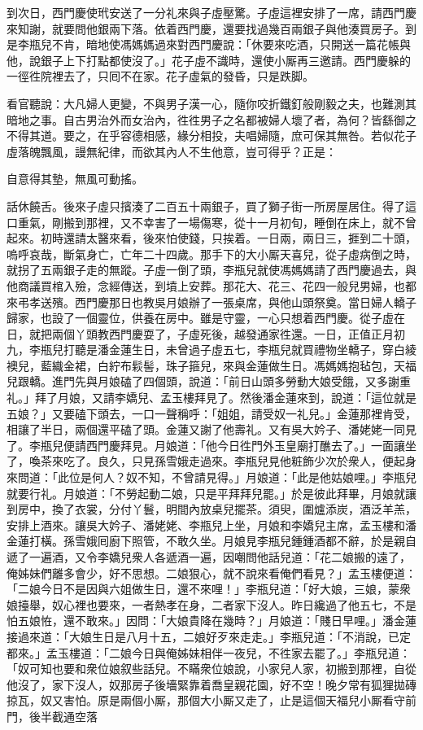 到次日，西門慶使玳安送了一分礼來與子虛壓驚。子虛這裡安排了一席，請西門慶來知謝，就要問他銀兩下落。依着西門慶，還要找過幾百兩銀子與他湊買房子。到是李瓶兒不肯，{}暗地使馮媽媽過來對西門慶說：「休要來吃酒，只開送一篇花帳與他，說銀子上下打點都使沒了。」花子虛不識時，還使小厮再三邀請。西門慶躲的一徑徃院裡去了，只囘不在家。花子虛氣的發昏，只是跌脚。

看官聽說：大凡婦人更變，不與男子漢一心，隨你咬折鐵釘般剛毅之夫，也難測其暗地之事。自古男治外而女治內，徃徃男子之名都被婦人壞了者，為何？皆繇御之不得其道。要之，在乎容德相感，緣分相投，夫唱婦隨，庶可保其無咎。若似花子虛落魄飄風，謾無紀律，而欲其內人不生他意，豈可得乎？正是：

自意得其墊，無風可動搖。

話休饒舌。後來子虛只擯湊了二百五十兩銀子，買了獅子街一所房屋居住。得了這口重氣，剛搬到那裡，又不幸害了一場傷寒，從十一月初旬，睡倒在床上，就不曾起來。初時還請太醫來看，後來怕使錢，只挨着。一日兩，兩日三，捱到二十頭，嗚呼哀哉，斷氣身亡，亡年二十四歲。{}那手下的大小厮天喜兒，從子虛病倒之時，就拐了五兩銀子走的無蹤。子虛一倒了頭，李瓶兒就使馮媽媽請了西門慶過去，與他商議買棺入殮，念經傳送，到墳上安葬。那花大、花三、花四一般兒男婦，也都來弔孝送殯。{}西門慶那日也教吳月娘辦了一張桌席，與他山頭祭奠。當日婦人轎子歸家，也設了一個靈位，供養在房中。雖是守靈，一心只想着西門慶。從子虛在日，就把兩個丫頭教西門慶耍了，子虛死後，越發通家徃還。一日，正值正月初九，李瓶兒打聽是潘金蓮生日，未曾過子虛五七，李瓶兒就買禮物坐轎子，穿白綾襖兒，藍織金裙，白紵布鬏髻，珠子箍兒，來與金蓮做生日。馮媽媽抱毡包，天福兒跟轎。進門先與月娘磕了四個頭，說道：「前日山頭多勞動大娘受餓，又多謝重礼。」拜了月娘，又請李嬌兒、孟玉樓拜見了。然後潘金蓮來到，說道：「這位就是五娘？」{}又要磕下頭去，一口一聲稱呼：「姐姐，{}請受奴一礼兒。」金蓮那裡肯受，相讓了半日，兩個還平磕了頭。金蓮又謝了他壽礼。又有吳大妗子、潘姥姥一同見了。{}李瓶兒便請西門慶拜見。月娘道：「他今日徃門外玉皇廟打醮去了。」一面讓坐了，喚茶來吃了。良久，只見孫雪娥走過來。李瓶兒見他粧飾少次於衆人，便起身來問道：「此位是何人？奴不知，不曾請見得。」月娘道：「此是他姑娘哩。」李瓶兒就要行礼。月娘道：「不勞起動二娘，只是平拜拜兒罷。」於是彼此拜畢，月娘就讓到房中，換了衣裳，分付丫鬟，明間內放桌兒擺茶。須臾，圍爐添炭，酒泛羊羔，安排上酒來。讓吳大妗子、潘姥姥、李瓶兒上坐，月娘和李嬌兒主席，孟玉樓和潘金蓮打橫。孫雪娥囘廚下照管，不敢久坐。月娘見李瓶兒鍾鍾酒都不辭，於是親自遞了一遍酒，又令李嬌兒衆人各遞酒一遍，因嘲問他話兒道：「花二娘搬的遠了，俺姊妹們離多會少，好不思想。二娘狠心，就不說來看俺們看見？」孟玉樓便道：「二娘今日不是因與六姐做生日，還不來哩！」李瓶兒道：「好大娘，三娘，蒙衆娘擡舉，{}奴心裡也要來，一者熱孝在身，二者家下沒人。昨日纔過了他五七，不是怕五娘恠，還不敢來。」因問：「大娘貴降在幾時？」月娘道：「賤日早哩。」潘金蓮接過來道：「大娘生日是八月十五，二娘好歹來走走。」李瓶兒道：「不消說，已定都來。」孟玉樓道：「二娘今日與俺姊妹相伴一夜兒，不徃家去罷了。」李瓶兒道：「奴可知也要和衆位娘叙些話兒。不瞞衆位娘說，小家兒人家，初搬到那裡，自從他沒了，家下沒人，奴那房子後墻緊靠着喬皇親花園，好不空！{}晚夕常有狐狸拋磚掠瓦，奴又害怕。原是兩個小厮，那個大小厮又走了，止是這個天福兒小厮看守前門，後半截通空落